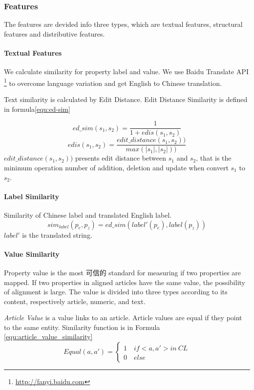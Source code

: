 \documentclass[runningheads,a4paper]{llncs}
\begin{document}
\subsubsection{Features}
The features are devided info three types, which are textual features, structural features and distributive features.

\paragraph{Textual Features} We calculate similarity for property label and value. We use Baidu Translate API \footnote{\url{http://fanyi.baidu.com}} to overcome language variation and get English to Chinese translation.

Text similarity is calculated by Edit Distance. Edit Distance Similarity is defined in formula\ref{equ:ed-sim}

\begin{equation}
\label{equ:ed-sim}
ed\_sim(s_1, s_2) = \frac{1}{1+edis(s_1,s_2)}
\end{equation}
\begin{equation}
edis(s_1,s_2)=\frac{edit\_distance(s_1, s_2))}{max(\left| s_1 \right |,\left | s_2 \right |))}
\end{equation}
$edit\_distance(s_1, s_2))$ presents edit distance between $s_1$ and $s_2$, that is the minimum operation number of addition, deletion and update when convert $s_1$ to $s_2$.

\paragraph{Label Similarity} Similarity of Chinese label and translated English label.
\begin{equation}
\label{}
sim_{label}(p_e, p_z) = ed\_sim(label'(p_e), label(p_z))
\end{equation}
$label'$ is the translated string.

\paragraph{Value Similarity} Property value is the most 可信的 standard for measuring if two properties are mapped. If two properties in aligned articles have the same value, the possibility of alignment is large. The value is divided into three types according to its content, respectively article, numeric, and text. 

\textit{Article Value} is a value links to an article. Article values are equal if they point to the same entity. Similarity function is in Formula \ref{equ:article_value_similarity}
\begin{equation}
Equal(a,a')=\left\{\begin{matrix}
1 \quad  if <a,a'> in \ CL\\
0 \quad  else
\end{matrix}\right.
\end{equation}
\end{document}

